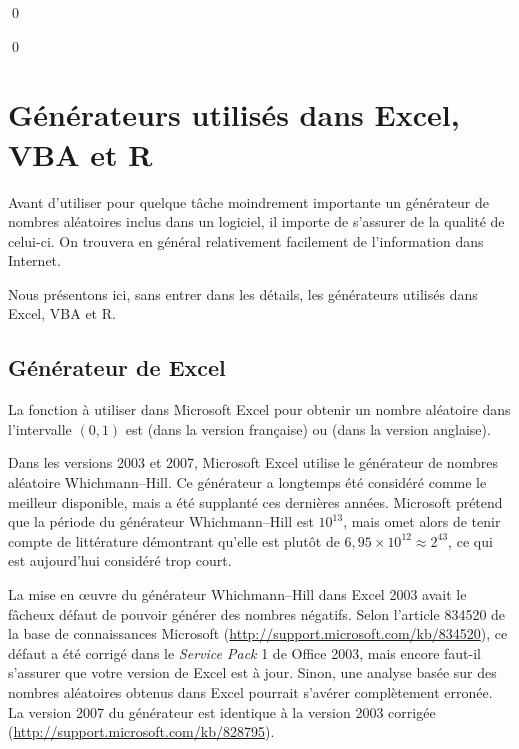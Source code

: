 \begin{exemple}
  \mbox{} \normalfont
  
  \qed
\end{exemple}

\begin{exemple}
  \mbox{} \normalfont
  
  \qed
\end{exemple}


\section{Générateurs utilisés dans Excel, VBA et R}

Avant d'utiliser pour quelque tâche moindrement importante un
générateur de nombres aléatoires inclus dans un logiciel, il importe
de s'assurer de la qualité de celui-ci. On trouvera en général
relativement facilement de l'information dans Internet.

Nous présentons ici, sans entrer dans les détails, les générateurs
utilisés dans Excel, VBA et R.

\subsection{Générateur de Excel}

La fonction à utiliser dans Microsoft Excel pour obtenir un nombre
aléatoire dans l'intervalle $(0, 1)$ est  (dans la
version française) ou  (dans la version anglaise).

Dans les versions 2003 et 2007, Microsoft Excel utilise le générateur
de nombres aléatoire Whichmann--Hill. Ce générateur a longtemps été
considéré comme le meilleur disponible, mais a été supplanté ces
dernières années. Microsoft prétend que la période du générateur
Whichmann--Hill est $10^{13}$, mais omet alors de tenir compte de
littérature démontrant qu'elle est plutôt de $6,95 \times 10^{12}
\approx 2^{43}$, ce qui est aujourd'hui considéré trop court.

\begin{sloppypar}
  La mise en {\oe}uvre du générateur Whichmann--Hill dans Excel 2003
  avait le fâcheux défaut de pouvoir générer des nombres négatifs.
  Selon l'article 834520 de la base de connaissances Microsoft
  (\url{http://support.microsoft.com/kb/834520}), ce défaut a été
  corrigé dans le \emph{Service Pack} 1 de Office 2003, mais encore
  faut-il s'assurer que votre version de Excel est à jour. Sinon, une
  analyse basée sur des nombres aléatoires obtenus dans Excel pourrait
  s'avérer complètement erronée. La version 2007 du générateur est
  identique à la version 2003 corrigée
  (\url{http://support.microsoft.com/kb/828795}).
\end{sloppypar}

